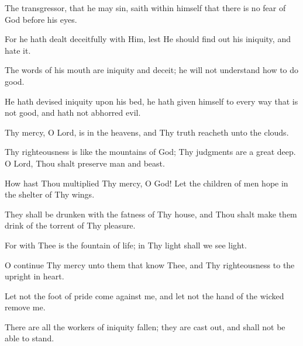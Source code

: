 The transgressor, that he may sin, saith within himself that there is no fear of God before his eyes.

For he hath dealt deceitfully with Him, lest He should find out his iniquity, and hate it.

The words of his mouth are iniquity and deceit; he will not understand how to do good.

He hath devised iniquity upon his bed, he hath given himself to every way that is not good, and hath not abhorred evil.

Thy mercy, O Lord, is in the heavens, and Thy truth reacheth unto the clouds.

Thy righteousness is like the mountains of God; Thy judgments are a great deep. O Lord, Thou shalt preserve man and
beast.

How hast Thou multiplied Thy mercy, O God! Let the children of men hope in the shelter of Thy wings.

They shall be drunken with the fatness of Thy house, and Thou shalt make them drink of the torrent of Thy pleasure.

For with Thee is the fountain of life; in Thy light shall we see light.

O continue Thy mercy unto them that know Thee, and Thy righteousness to the upright in heart.

Let not the foot of pride come against me, and let not the hand of the wicked remove me.

There are all the workers of iniquity fallen; they are cast out, and shall not be able to stand.
